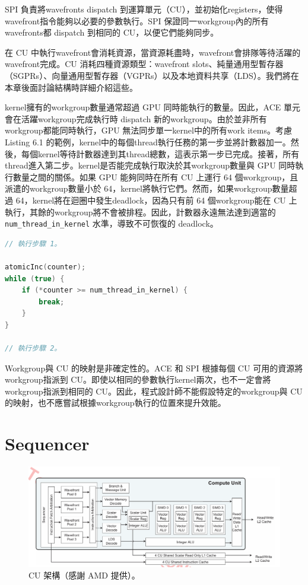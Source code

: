 SPI 負責將wavefronts dispatch 到運算單元（CU），並初始化registers，使得wavefront指令能夠以必要的參數執行。SPI 保證同一workgroup內的所有wavefronts都 dispatch 到相同的 CU，以便它們能夠同步。

在 CU 中執行wavefront會消耗資源，當資源耗盡時，wavefront會排隊等待活躍的wavefront完成。CU 消耗四種資源類型：wavefront slots、純量通用型暫存器（SGPRs）、向量通用型暫存器（VGPRs）以及本地資料共享（LDS）。我們將在本章後面討論結構時詳細介紹這些。

kernel擁有的workgroup數量通常超過 GPU 同時能執行的數量。因此，ACE 單元會在活躍workgroup完成執行時 dispatch 新的workgroup。由於並非所有workgroup都能同時執行，GPU 無法同步單一kernel中的所有work items。考慮 Listing 6.1 的範例，kernel中的每個thread執行任務的第一步並將計數器加一。然後，每個kernel等待計數器達到其thread總數，這表示第一步已完成。接著，所有thread進入第二步。kernel是否能完成執行取決於其workgroup數量與 GPU 同時執行數量之間的關係。如果 GPU 能夠同時在所有 CU 上運行 64 個workgroup，且派遣的workgroup數量小於 64，kernel將執行它們。然而，如果workgroup數量超過 64，kernel將在迴圈中發生deadlock，因為只有前 64 個workgroup能在 CU 上執行，其餘的workgroup將不會被排程。因此，計數器永遠無法達到適當的 \texttt{num\_thread\_in\_kernel} 水準，導致不可恢復的 deadlock。

\lstset{style=mystyle}
\begin{lstlisting}[language=c++,caption={deadlock範例程式碼。計數器定義為一個volatile指標，並初始化為零。}]
// 執行步驟 1。

atomicInc(counter);
while (true) {
    if (*counter >= num_thread_in_kernel) {
        break;
    }
}

// 執行步驟 2。
\end{lstlisting}

Workgroup與 CU 的映射是非確定性的。ACE 和 SPI 根據每個 CU 可用的資源將workgroup指派到 CU。即使以相同的參數執行kernel兩次，也不一定會將workgroup指派到相同的 CU。因此，程式設計師不能假設特定的workgroup與 CU 的映射，也不應嘗試根據workgroup執行的位置來提升效能。

\section{Sequencer}
\label{sec:sequencer}
\begin{figure}[h]
    \centering
    \includegraphics[width=1\linewidth]{FileAusiliari//Screenshots/Figure6-2.png}
    \caption{CU 架構（感謝 AMD 提供）。}
    \label{fig:enter-label}
\end{figure}

